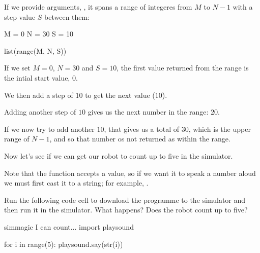 \documentclass[letterpaper,10pt,english]{sphinxmanual}
\begin{document}
If we provide  arguments, , it spans a range of integeres from \(M\) to \(N-1\) with a step value \(S\) between them:

{
\begin{sphinxVerbatim}[commandchars=\\\{\}]
\llap{\color{nbsphinxin}[ ]:\,\hspace{\fboxrule}\hspace{\fboxsep}}M = 0
N = 30
S = 10

list(range(M, N, S))
\end{sphinxVerbatim}
}

If we set \(M=0\), \(N=30\) and \(S=10\), the first value returned from the range is the intial start value, \(0\).

We then add a step of \(10\) to get the next value (\(10\)).

Adding another step of \(10\) gives us the next number in the range: \(20\).

If we now try to add another \(10\), that gives us a total of \(30\), which is  the upper range of \(N-1\), and so that number os not returned as within the range.

Now let’s see if we can get our robot to count up to five in the simulator.

Note that the  function accepts a  value, so if we want it to speak a number aloud we must first cast it to a string; for example, .


Run the following code cell to download the programme to the simulator and then run it in the simulator. What happens? Does the robot count up to five?

{
\begin{sphinxVerbatim}[commandchars=\\\{\}]
\llap{\color{nbsphinxin}[ ]:\,\hspace{\fboxrule}\hspace{\fboxsep}}\PYGZpc{}\PYGZpc{}sim\PYGZus{}magic
\PYGZsh{} I can count...
import playsound

for i in range(5):
    playsound.say(str(i))
\end{sphinxVerbatim}
}
\end{document}
